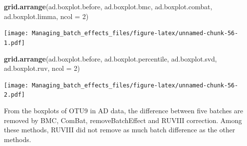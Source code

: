 \documentclass[]{book}
\newenvironment{Shaded}{\begin{snugshade}}{\end{snugshade}}
\newcommand{\KeywordTok}[1]{\textcolor[rgb]{0.13,0.29,0.53}{\textbf{#1}}}
\newcommand{\DataTypeTok}[1]{\textcolor[rgb]{0.13,0.29,0.53}{#1}}
\newcommand{\DecValTok}[1]{\textcolor[rgb]{0.00,0.00,0.81}{#1}}
\newcommand{\StringTok}[1]{\textcolor[rgb]{0.31,0.60,0.02}{#1}}
\newcommand{\OperatorTok}[1]{\textcolor[rgb]{0.81,0.36,0.00}{\textbf{#1}}}
\newcommand{\NormalTok}[1]{#1}
\begin{document}
\begin{Shaded}
\end{Shaded}

\begin{Shaded}
\begin{Highlighting}[]
\KeywordTok{grid.arrange}\NormalTok{(ad.boxplot.before, ad.boxplot.bmc, }
\NormalTok{             ad.boxplot.combat, ad.boxplot.limma, }\DataTypeTok{ncol =} \DecValTok{2}\NormalTok{)}
\end{Highlighting}
\end{Shaded}

\texttt{[image: Managing\_batch\_effects\_files/figure-latex/unnamed-chunk-56-1.pdf]}

\begin{Shaded}
\begin{Highlighting}[]
\KeywordTok{grid.arrange}\NormalTok{(ad.boxplot.before, ad.boxplot.percentile, }
\NormalTok{             ad.boxplot.svd, ad.boxplot.ruv, }\DataTypeTok{ncol =} \DecValTok{2}\NormalTok{)}
\end{Highlighting}
\end{Shaded}

\texttt{[image: Managing\_batch\_effects\_files/figure-latex/unnamed-chunk-56-2.pdf]}

From the boxplots of OTU9 in AD data, the difference between five
batches are removed by BMC, ComBat, removeBatchEffect and RUVIII
correction. Among these methods, RUVIII did not remove as much batch
difference as the other methods.
\end{document}
